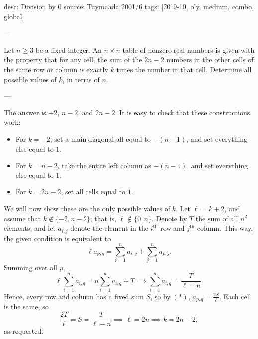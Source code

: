 desc: Division by 0
source: Tuymaada 2001/6
tags: [2019-10, oly, medium, combo, global]

---

Let $n\ge 3$ be a fixed integer. An $n\times n$ table of nonzero real numbers is given with the property that for any cell, the sum of the $2n-2$ numbers in the other cells of the same row or column is exactly $k$ times the number in that cell. Determine all possible values of $k$, in terms of $n$.

---

The answer is $-2$, $n-2$, and $2n-2$. It is easy to check that these constructions work:
\begin{itemize}[itemsep=0em]
    \item For $k=-2$, set a main diagonal all equal to $-(n-1)$, and set everything else equal to $1$.
    \item For $k=n-2$, take the entire left column as $-(n-1)$, and set everything else equal to $1$.
    \item For $k=2n-2$, set all cells equal to $1$.
\end{itemize}
We will now show these are the only possible values of $k$. Let $\ell=k+2$, and assume that $k\notin\{-2,n-2\}$; that is, $\ell\notin\{0,n\}$. Denote by $T$ the sum of all $n^2$ elements, and let $a_{i,j}$ denote the element in the $i^\text{th}$ row and $j^\text{th}$ column. This way, the given condition is equivalent to
\begin{equation}\tag{$*$}
    \ell a_{p,q}=\sum_{i=1}^n a_{i,q}+\sum_{j=1}^n a_{p,j}.
\end{equation}
Summing over all $p$, \[\ell\sum_{i=1}^na_{i,q}=n\sum_{i=1}^na_{i,q}+T\implies\sum_{i=1}^na_{i,q}=\frac T{\ell-n}.\]
Hence, every row and column has a fixed sum $S$, so by $(*)$, $a_{p,q}=\tfrac{2S}\ell$. Each cell is the same, so \[\frac{2T}\ell=S=\frac T{\ell-n}\implies\ell=2n\implies k=2n-2,\]
as requested.

